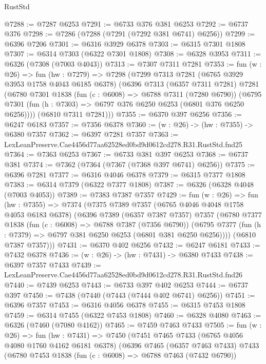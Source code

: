 \begin{lexlean}{RustStd}
\begin{coremodule}
@7288 := @7287 @6253
@7291 := @6733 @376 @381 @6253
@7292 := @6737 @376
@7298 := @7286 (@7288 (@7291 (@7292 @381 @6741) @6256))
@7299 := @6396 @7206
@7301 := @6316 @3929 @6378
@7303 := @6315 @7301 @1808
@7307 := @6314 @7303 (@6322 @7301 @1808)
@7308 := @6328 @3953
@7311 := @6326 (@7308 (@7003 @4043))
@7313 := @7307 @7311 @7281
@7353 := fun (w : @26) =>
  fun (hw : @7279) =>
  @7298
    (@7299
      @7313
      @7281
      (@6765 @3929 @3953 @1758 @4043 @6185 @6378)
      (@6396
        @7313
        (@6357 @7311 @7281)
        @7281
        (@6780
          @7301
          @1838
          (fun (c : @6008) => @6788 @7311 (@7280 @6790))
          (@6795 @7301 (fun (h : @7303) => @6797 @376 @6250 @6253 (@6801 @376 @6250 @6256))))
        (@6810 @7311 @7281)))
@7355 := @6370 @397 @6256
@7356 := @6247 @6183
@7357 := @7356 @6378
@7360 := (w : @26) -> (hw : @7355) -> @6380 @7357
@7362 := @6397 @7281 @7357
@7363 := LexLeanPreserve.Cae4456d77aa62528ed0bd9d0612cd278.R31.RustStd.fnd25
@7364 := @7363 @6253
@7367 := @6733 @381 @397 @6253
@7368 := @6737 @381
@7374 := @7362 (@7364 (@7367 (@7368 @397 @6741) @6256))
@7375 := @6396 @7281
@7377 := @6316 @4046 @6378
@7379 := @6315 @7377 @1808
@7383 := @6314 @7379 (@6322 @7377 @1808)
@7387 := @6326 (@6328 @4048 (@7003 @4053))
@7389 := @7383 @7387 @7357
@7429 := fun (w : @26) =>
  fun (hw : @7355) =>
  @7374
    (@7375
      @7389
      @7357
      (@6765 @4046 @4048 @1758 @4053 @6183 @6378)
      (@6396
        @7389
        (@6357 @7387 @7357)
        @7357
        (@6780
          @7377
          @1838
          (fun (c : @6008) => @6788 @7387 (@7356 @6790))
          (@6795 @7377 (fun (h : @7379) => @6797 @381 @6250 @6253 (@6801 @381 @6250 @6256))))
        (@6810 @7387 @7357)))
@7431 := @6370 @402 @6256
@7432 := @6247 @6181
@7433 := @7432 @6378
@7436 := (w : @26) -> (hw : @7431) -> @6380 @7433
@7438 := @6397 @7357 @7433
@7439 := LexLeanPreserve.Cae4456d77aa62528ed0bd9d0612cd278.R31.RustStd.fnd26
@7440 := @7439 @6253
@7443 := @6733 @397 @402 @6253
@7444 := @6737 @397
@7450 := @7438 (@7440 (@7443 (@7444 @402 @6741) @6256))
@7451 := @6396 @7357
@7453 := @6316 @4056 @6378
@7455 := @6315 @7453 @1808
@7459 := @6314 @7455 (@6322 @7453 @1808)
@7460 := @6328 @4080
@7463 := @6326 (@7460 (@7080 @4162))
@7465 := @7459 @7463 @7433
@7505 := fun (w : @26) =>
  fun (hw : @7431) =>
  @7450
    (@7451
      @7465
      @7433
      (@6765 @4056 @4080 @1760 @4162 @6181 @6378)
      (@6396
        @7465
        (@6357 @7463 @7433)
        @7433
        (@6780
          @7453
          @1838
          (fun (c : @6008) => @6788 @7463 (@7432 @6790))

\end{coremodule}
\end{lexlean}
